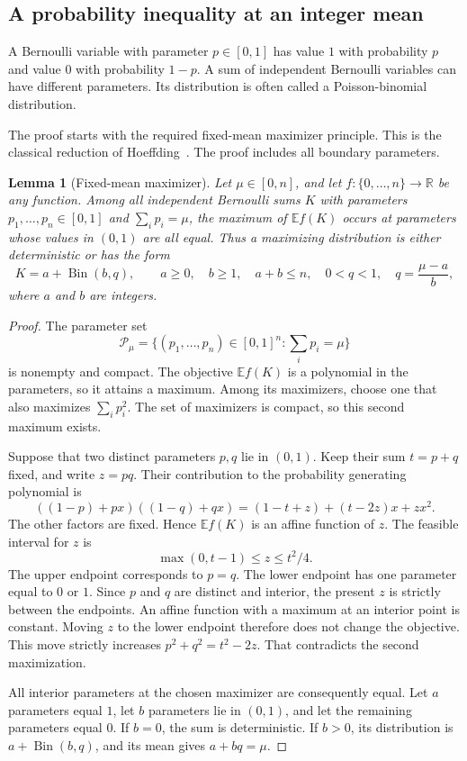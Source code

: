 \documentclass[11pt,a4paper]{article}
\newtheorem{lemma}[theorem]{Lemma}
\theoremstyle{definition}
\theoremstyle{remark}
\newcommand{\R}{\mathbb{R}}
\begin{document}
\subsection{A probability inequality at an integer mean}

A Bernoulli variable with parameter $p\in[0,1]$ has value $1$ with
probability $p$ and value $0$ with probability $1-p$. A sum of independent
Bernoulli variables can have different parameters. Its distribution is
often called a Poisson-binomial distribution.

The proof starts with the required fixed-mean maximizer principle.
This is the classical reduction of Hoeffding~\cite{hoeffding56}.
The proof includes all boundary parameters.

\begin{lemma}[Fixed-mean maximizer]\label{lem:fb-maximizer}
Let $\mu\in[0,n]$, and let $f:\{0,\ldots,n\}\to\R$ be any function.
Among all independent Bernoulli sums $K$ with parameters
$p_1,\ldots,p_n\in[0,1]$ and $\sum_i p_i=\mu$, the maximum of
$\mathbb{E}f(K)$ occurs at parameters whose values in $(0,1)$ are all
equal. Thus a maximizing distribution is either deterministic or has
the form
\[
 K=a+\operatorname{Bin}(b,q),\qquad
 a\geq0,\quad b\geq1,\quad a+b\leq n,\quad
 0<q<1,\quad q=\frac{\mu-a}{b},
\]
where $a$ and $b$ are integers.
\end{lemma}

\begin{proof}
The parameter set
\[
 \mathcal P_\mu=
 \{(p_1,\ldots,p_n)\in[0,1]^n:\textstyle\sum_i p_i=\mu\}
\]
is nonempty and compact. The objective $\mathbb{E}f(K)$ is a
polynomial in the parameters, so it attains a maximum. Among its
maximizers, choose one that also maximizes $\sum_i p_i^2$.
The set of maximizers is compact, so this second maximum exists.

Suppose that two distinct parameters $p,q$ lie in $(0,1)$.
Keep their sum $t=p+q$ fixed, and write $z=pq$. Their contribution
to the probability generating polynomial is
\[
 ((1-p)+px)((1-q)+qx)
 =(1-t+z)+(t-2z)x+zx^2.
\]
The other factors are fixed. Hence $\mathbb{E}f(K)$ is an affine
function of $z$. The feasible interval for $z$ is
\[
 \max(0,t-1)\leq z\leq t^2/4.
\]
The upper endpoint corresponds to $p=q$. The lower endpoint has
one parameter equal to $0$ or $1$. Since $p$ and $q$ are distinct
and interior, the present $z$ is strictly between the endpoints.
An affine function with a maximum at an interior point is constant.
Moving $z$ to the lower endpoint therefore does not change
the objective. This move strictly increases
$p^2+q^2=t^2-2z$. That contradicts the second maximization.

All interior parameters at the chosen maximizer are consequently
equal. Let $a$ parameters equal $1$, let $b$ parameters lie in
$(0,1)$, and let the remaining parameters equal $0$.
If $b=0$, the sum is deterministic. If $b>0$, its distribution is
$a+\operatorname{Bin}(b,q)$, and its mean gives $a+bq=\mu$.
\end{proof}
\end{document}
